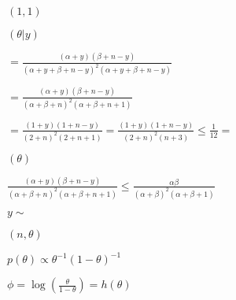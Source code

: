 \documentclass[english]{article}
\theoremstyle{plain}
\def\lthtmlcheckvsize{\ifdim\ht\sizebox<\vsize 
  \ifdim\wd\sizebox<\hsize\expandafter\hfill\fi \expandafter\vfill
  \else\expandafter\vss\fi}%
\begin{document}
{\newpage\clearpage
{}%
$ \left(1,1\right)$%
\lthtmlindisplaymathZ
\lthtmlcheckvsize\clearpage}

{\newpage\clearpage
{}%
$\displaystyle \left(\theta|y\right)$%
\lthtmlindisplaymathZ
\lthtmlcheckvsize\clearpage}

{\newpage\clearpage
{}%
$\displaystyle =\frac{\left(\alpha+y\right)\left(\beta+n-y\right)}{\left(\alpha+y+\beta+n-y\right)^{2}\left(\alpha+y+\beta+n-y\right)}$%
\lthtmlindisplaymathZ
\lthtmlcheckvsize\clearpage}

{\newpage\clearpage
{}%
$\displaystyle =\frac{\left(\alpha+y\right)\left(\beta+n-y\right)}{\left(\alpha+\beta+n\right)^{2}\left(\alpha+\beta+n+1\right)}$%
\lthtmlindisplaymathZ
\lthtmlcheckvsize\clearpage}

{\newpage\clearpage
{}%
$\displaystyle =\frac{\left(1+y\right)\left(1+n-y\right)}{\left(2+n\right)^{2}\left(2+n+1\right)}=\frac{\left(1+y\right)\left(1+n-y\right)}{\left(2+n\right)^{2}\left(n+3\right)}\leq\frac{1}{12}=$%
\lthtmlindisplaymathZ
\lthtmlcheckvsize\clearpage}

{\newpage\clearpage
{}%
$\displaystyle \left(\theta\right)$%
\lthtmlindisplaymathZ
\lthtmlcheckvsize\clearpage}

{\newpage\clearpage
{}%
$\displaystyle \frac{\left(\alpha+y\right)\left(\beta+n-y\right)}{\left(\alpha+\beta+n\right)^{2}\left(\alpha+\beta+n+1\right)}\leq\frac{\alpha\beta}{\left(\alpha+\beta\right)^{2}\left(\alpha+\beta+1\right)}
$%
\lthtmlindisplaymathZ
\lthtmlcheckvsize\clearpage}

{\newpage\clearpage
{}%
$ y\sim$%
\lthtmlindisplaymathZ
\lthtmlcheckvsize\clearpage}

{\newpage\clearpage
{}%
$ \left(n,\theta\right)$%
\lthtmlindisplaymathZ
\lthtmlcheckvsize\clearpage}

{\newpage\clearpage
{}%
$ p\left(\theta\right)\propto\theta^{-1}\left(1-\theta\right)^{-1}$%
\lthtmlindisplaymathZ
\lthtmlcheckvsize\clearpage}

{\newpage\clearpage
{}%
$ \phi=\log\left(\frac{\theta}{1-\theta}\right)=h\left(\theta\right)$%
\lthtmlindisplaymathZ
\lthtmlcheckvsize\clearpage}
\end{document}
